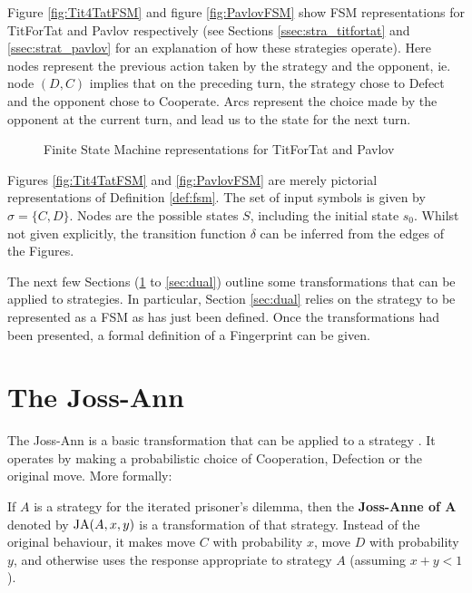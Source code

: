Figure \ref{fig:Tit4TatFSM} and figure \ref{fig:PavlovFSM} show FSM representations for TitForTat and Pavlov respectively (see Sections \ref{ssec:stra_titfortat} and \ref{ssec:strat_pavlov} for an explanation of how these strategies operate).
Here nodes represent the previous action taken by the strategy and the opponent, ie. node $(D, C)$ implies that on the preceding turn, the strategy chose to Defect and the opponent chose to Cooperate.
Arcs represent the choice made by the opponent at the current turn, and lead us to the state for the next turn.

\begin{figure}[hbtp!]
\centering
{}
\caption{Finite State Machine representations for TitForTat and Pavlov}
\end{figure}

Figures \ref{fig:Tit4TatFSM} and \ref{fig:PavlovFSM} are merely pictorial representations of Definition \ref{def:fsm}.
The set of input symbols is given by $\sigma = \{C, D\}$.
Nodes are the possible states $S$, including the initial state $s_0$.
Whilst not given explicitly, the transition function $\delta$ can be inferred from the edges of the Figures.

The next few Sections (\ref{sec:joss-ann} to \ref{sec:dual}) outline some transformations that can be applied to strategies.
In particular, Section \ref{sec:dual} relies on the strategy to be represented as a FSM as has just been defined.
Once the transformations had been presented, a formal definition of a Fingerprint can be given.



\section{The Joss-Ann}\label{sec:joss-ann}
The Joss-Ann is a basic transformation that can be applied to a strategy \cite{Ashlock2008, Ashlock2010, Ashlock2004,  Ashlock2005, Ashlock2009, Ashlock2006}.
It operates by making a probabilistic choice of Cooperation, Defection or the original move.
More formally:

\begin{definition}\label{def:joss-ann}
If $A$ is a strategy for the iterated prisoner's dilemma, then the \textbf{Joss-Anne of A} denoted by $\text{JA}(A, x, y)$ is a transformation of that strategy.
Instead of the original behaviour, it makes move $C$ with probability $x$, move $D$ with probability $y$, and otherwise uses the response appropriate to strategy $A$ (assuming $x+y < 1$).
\end{definition}

